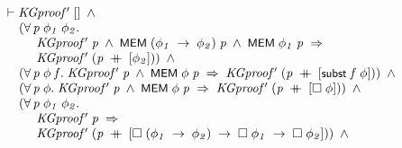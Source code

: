 \documentclass{report}
\renewcommand{\HOLConst}[1]{{\textsf{\upshape\small #1}}}
\newenvironment{holmath}{\begin{displaymath}\begin{array}{l}}{\end{array}\end{displaymath}\ignorespacesafterend}
\begin{document}
\begin{holmath}
  \ensuremath{\HOLTokenTurnstile}\HOLFreeVar{KGproof\sp{\prime}}\;[]\;\HOLSymConst{\HOLTokenConj{}}\\
\;\;\;\;\;(\HOLSymConst{\HOLTokenForall{}}\HOLBoundVar{p}\;\HOLBoundVar{\ensuremath{\phi\sb{1}}}\;\HOLBoundVar{\ensuremath{\phi\sb{2}}}.\\
\;\;\;\;\;\;\;\;\;\;\HOLFreeVar{KGproof\sp{\prime}}\;\HOLBoundVar{p}\;\HOLSymConst{\HOLTokenConj{}}\;\HOLConst{MEM}\;(\HOLBoundVar{\ensuremath{\phi\sb{1}}}\;\HOLSymConst{\ensuremath{\rightarrow}}\;\HOLBoundVar{\ensuremath{\phi\sb{2}}})\;\HOLBoundVar{p}\;\HOLSymConst{\HOLTokenConj{}}\;\HOLConst{MEM}\;\HOLBoundVar{\ensuremath{\phi\sb{1}}}\;\HOLBoundVar{p}\;\HOLSymConst{\HOLTokenImp{}}\\
\;\;\;\;\;\;\;\;\;\;\HOLFreeVar{KGproof\sp{\prime}}\;(\HOLBoundVar{p}\;\HOLSymConst{\HOLTokenDoublePlus}\;[\HOLBoundVar{\ensuremath{\phi\sb{2}}}]))\;\HOLSymConst{\HOLTokenConj{}}\\
\;\;\;\;\;(\HOLSymConst{\HOLTokenForall{}}\HOLBoundVar{p}\;\HOLBoundVar{\ensuremath{\phi}}\;\HOLBoundVar{f}.\;\HOLFreeVar{KGproof\sp{\prime}}\;\HOLBoundVar{p}\;\HOLSymConst{\HOLTokenConj{}}\;\HOLConst{MEM}\;\HOLBoundVar{\ensuremath{\phi}}\;\HOLBoundVar{p}\;\HOLSymConst{\HOLTokenImp{}}\;\HOLFreeVar{KGproof\sp{\prime}}\;(\HOLBoundVar{p}\;\HOLSymConst{\HOLTokenDoublePlus}\;[\HOLConst{subst}\;\HOLBoundVar{f}\;\HOLBoundVar{\ensuremath{\phi}}]))\;\HOLSymConst{\HOLTokenConj{}}\\
\;\;\;\;\;(\HOLSymConst{\HOLTokenForall{}}\HOLBoundVar{p}\;\HOLBoundVar{\ensuremath{\phi}}.\;\HOLFreeVar{KGproof\sp{\prime}}\;\HOLBoundVar{p}\;\HOLSymConst{\HOLTokenConj{}}\;\HOLConst{MEM}\;\HOLBoundVar{\ensuremath{\phi}}\;\HOLBoundVar{p}\;\HOLSymConst{\HOLTokenImp{}}\;\HOLFreeVar{KGproof\sp{\prime}}\;(\HOLBoundVar{p}\;\HOLSymConst{\HOLTokenDoublePlus}\;[\HOLSymConst{\ensuremath{\Box}}\;\HOLBoundVar{\ensuremath{\phi}}]))\;\HOLSymConst{\HOLTokenConj{}}\\
\;\;\;\;\;(\HOLSymConst{\HOLTokenForall{}}\HOLBoundVar{p}\;\HOLBoundVar{\ensuremath{\phi\sb{1}}}\;\HOLBoundVar{\ensuremath{\phi\sb{2}}}.\\
\;\;\;\;\;\;\;\;\;\;\HOLFreeVar{KGproof\sp{\prime}}\;\HOLBoundVar{p}\;\HOLSymConst{\HOLTokenImp{}}\\
\;\;\;\;\;\;\;\;\;\;\HOLFreeVar{KGproof\sp{\prime}}\;(\HOLBoundVar{p}\;\HOLSymConst{\HOLTokenDoublePlus}\;[\HOLSymConst{\ensuremath{\Box}}\;(\HOLBoundVar{\ensuremath{\phi\sb{1}}}\;\HOLSymConst{\ensuremath{\rightarrow}}\;\HOLBoundVar{\ensuremath{\phi\sb{2}}})\;\HOLSymConst{\ensuremath{\rightarrow}}\;\HOLSymConst{\ensuremath{\Box}}\;\HOLBoundVar{\ensuremath{\phi\sb{1}}}\;\HOLSymConst{\ensuremath{\rightarrow}}\;\HOLSymConst{\ensuremath{\Box}}\;\HOLBoundVar{\ensuremath{\phi\sb{2}}}]))\;\HOLSymConst{\HOLTokenConj{}}\\

\end{holmath}
\end{document}
